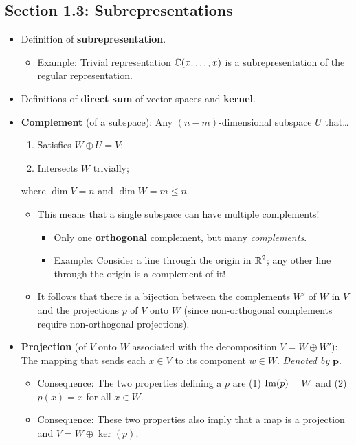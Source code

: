 \documentclass[../notes.tex]{subfiles}
\begin{document}
\subsection*{Section 1.3: Subrepresentations}
\begin{itemize}
    \item Definition of \textbf{subrepresentation}.
    \begin{itemize}
        \item Example: Trivial representation $\mathbb{C}(x,\dots,x)$ is a subrepresentation of the regular representation.
    \end{itemize}
    \item Definitions of \textbf{direct sum} of vector spaces and \textbf{kernel}.
    \item \textbf{Complement} (of a subspace): Any $(n-m)$-dimensional subspace $U$ that\dots
    \begin{enumerate}
        \item Satisfies $W\oplus U=V$;
        \item Intersects $W$ trivially;
    \end{enumerate}
    where $\dim V=n$ and $\dim W=m\leq n$.
    \begin{itemize}
        \item This means that a single subspace can have multiple complements!
        \begin{itemize}
            \item Only one \textbf{orthogonal} complement, but many \emph{complements}.
            \item Example: Consider a line through the origin in $\mathbb{R}^2$; any other line through the origin is a complement of it!
        \end{itemize}
        \item It follows that there is a bijection between the complements $W'$ of $W$ in $V$ and the projections $p$ of $V$ onto $W$ (since non-orthogonal complements require non-orthogonal projections).
    \end{itemize}
    \item \textbf{Projection} (of $V$ onto $W$ associated with the decomposition $V=W\oplus W'$): The mapping that sends each $x\in V$ to its component $w\in W$. \emph{Denoted by} $\bm{p}$.
    \begin{itemize}
        \item Consequence: The two properties defining a $p$ are (1) $\operatorname{Im}(p)=W$ and (2) $p(x)=x$ for all $x\in W$.
        \item Consequence: These two properties also imply that a map is a projection and $V=W\oplus\ker(p)$.

\end{itemize}
\end{itemize}
\end{document}
